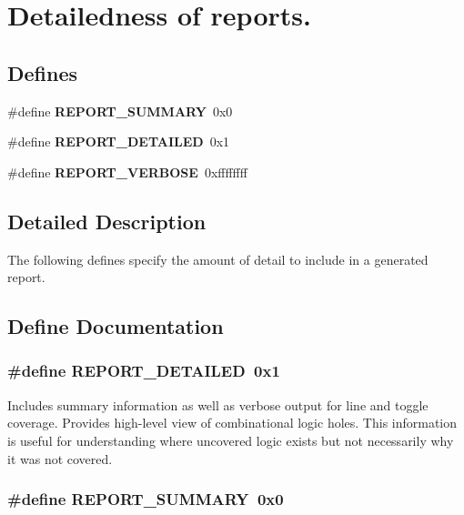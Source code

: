 \section{Detailedness of reports.}
\label{group__report__detail}
\subsection*{Defines}
\begin{CompactItemize}
\item 
\#define {\bf REPORT\_\-SUMMARY}\ 0x0
\item 
\#define {\bf REPORT\_\-DETAILED}\ 0x1
\item 
\#define {\bf REPORT\_\-VERBOSE}\ 0xffffffff
\end{CompactItemize}


\subsection{Detailed Description}
The following defines specify the amount of detail to include in a generated report. 

\subsection{Define Documentation}
\subsubsection{\setlength{\rightskip}{0pt plus 5cm}\#define REPORT\_\-DETAILED\ 0x1}\label{group__report__detail_a1}


Includes summary information as well as verbose output for line and toggle coverage. Provides high-level view of combinational logic holes. This information is useful for understanding where uncovered logic exists but not necessarily why it was not covered. 
\subsubsection{\setlength{\rightskip}{0pt plus 5cm}\#define REPORT\_\-SUMMARY\ 0x0}\label{group__report__detail_a0}



